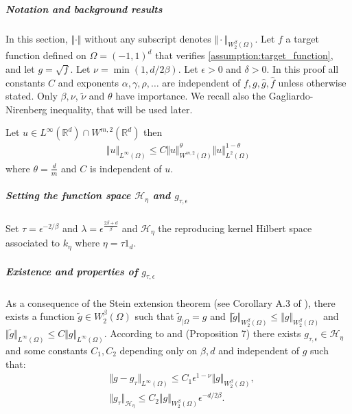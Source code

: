 \subparagraph{Notation and background results} In this section, $\Vert \cdot \Vert$ without any subscript denotes $\Vert \cdot\Vert_{W_2^\beta(\Omega)}$. Let $f$ a target function defined on $\Omega = (-1, 1)^d$ that verifies \cref{assumption:target_function}, and let $g = \sqrt{f}$. Let $\nu = \min(1, d/2\beta)$. Let $\epsilon > 0$ and $\delta > 0$. In this proof all constants $C$ and exponents $\alpha, \gamma, \rho, \ldots$ are independent of $f, g, \hat g, \hat f$ unless otherwise stated. Only $\beta, \nu$, $\tilde \nu$ and $\theta$ have importance. We recall also the Gagliardo-Nirenberg inequality, that will be used later.
\begin{lemma}\label{lemma:gargliano}
Let $u\in L^\infty(\mathbb R^d)\cap W^{m, 2}(\mathbb R^d)$ then
    \begin{align}
        \Vert u \Vert_{L^\infty(\Omega)} \leq C \Vert u\Vert_{W^{m, 2}(\Omega)}^\theta \Vert u\Vert_{L^2(\Omega)}^{1-\theta}
    \end{align}
    where $\theta = \frac{d}{m}$ and $C$ is independent of $u$.
\end{lemma}


\subparagraph{Setting the function space $\mathcal H_\eta$ and $g_{\tau, \epsilon}$}
Set $\tau = \epsilon^{-2/\beta}$ and $\lambda = \epsilon^{\frac{2\beta + d}{\beta}}$ and $\mathcal H_\eta$ the reproducing kernel Hilbert space associated to $k_\eta$ where $\eta = \tau 1_d$.

\subparagraph{Existence and properties of $g_{\tau, \epsilon}$}
As a consequence of the Stein extension theorem (see Corollary A.3 of \cite{ciliberto2021}), there exists a function $\tilde g \in W^\beta_2(\Omega)$ such that $\tilde g_{\vert \Omega}=g$ and $\Vert \tilde g\Vert_{W_2^\beta(\Omega)} \leq\Vert g\Vert_{W_2^\beta(\Omega)}$ and $\Vert \tilde g\Vert_{L^\infty(\Omega)}\leq C\Vert g\Vert_{L^\infty(\Omega)}$.
%
According to \cite{ciliberto2021} and \cite{sampling-ulysse} (Proposition 7) there exists $g_{\tau, \epsilon}\in\mathcal H_\eta$ and some constants $C_1, C_2$ depending only on $\beta, d$ and independent of $g$ such that:
\begin{align}
&\Vert g - g_\tau \Vert_{L^\infty(\Omega)} \leq C_1 \epsilon^{1- \nu}\Vert g\Vert_{W^\beta_2(\Omega)}\label{eq:g-g-tau},\\
&\Vert g_\tau \Vert_{\mathcal H_\eta}\leq C_2 \Vert g\Vert_{W^\beta_2(\Omega)}\epsilon^{-d/2\beta}\label{eq:g-tau}.
\end{align}

